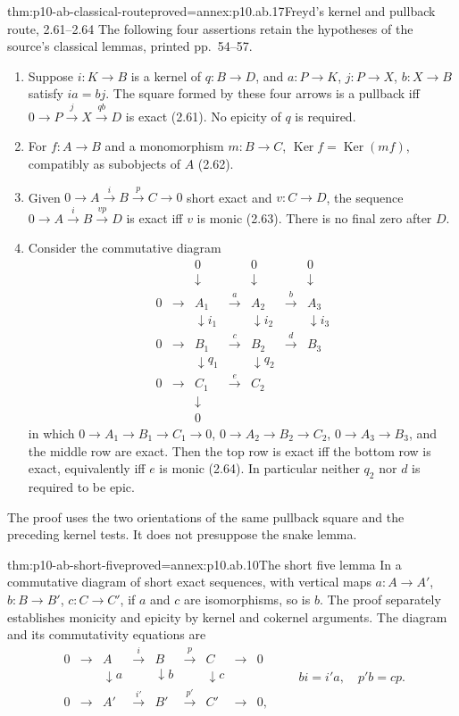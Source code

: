 \begin{hbtheorem}{thm:p10-ab-classical-route}{proved=annex:p10.ab.17}{Freyd's kernel and pullback route, 2.61--2.64}
The following four assertions retain the hypotheses of the source's
classical lemmas, printed pp.~54--57.
\begin{enumerate}
\item Suppose \(i:K\to B\) is a kernel of \(q:B\to D\), and
\(a:P\to K\), \(j:P\to X\), \(b:X\to B\) satisfy \(ia=bj\).
The square formed by these four arrows is a pullback iff
\(0\to P\xrightarrow j X\xrightarrow{qb}D\) is exact (2.61).
No epicity of \(q\) is required.
\item For \(f:A\to B\) and a monomorphism \(m:B\to C\),
\(\operatorname{Ker}f=\operatorname{Ker}(mf)\), compatibly as
subobjects of \(A\) (2.62).
\item Given \(0\to A\xrightarrow i B\xrightarrow p C\to0\)
short exact and \(v:C\to D\), the sequence
\(0\to A\xrightarrow i B\xrightarrow{vp}D\) is exact iff
\(v\) is monic (2.63). There is no final zero after \(D\).
\item Consider the commutative diagram
\[
\begin{array}{ccccccc}
 &&0&&0&&0\\
 &&\downarrow&&\downarrow&&\downarrow\\
 0&\to&A_1&\xrightarrow{a}&A_2&\xrightarrow{b}&A_3\\
 &&\downarrow i_1&&\downarrow i_2&&\downarrow i_3\\
 0&\to&B_1&\xrightarrow{c}&B_2&\xrightarrow{d}&B_3\\
 &&\downarrow q_1&&\downarrow q_2&&\\
 0&\to&C_1&\xrightarrow{e}&C_2&&\\
 &&\downarrow&&&&\\
 &&0&&&&
\end{array}
\]
in which \(0\to A_1\to B_1\to C_1\to0\),
\(0\to A_2\to B_2\to C_2\), \(0\to A_3\to B_3\),
and the middle row are exact. Then the top row is exact iff the
bottom row is exact, equivalently iff \(e\) is monic (2.64).
In particular neither \(q_2\) nor \(d\) is required to be epic.
\end{enumerate}
The proof uses the two orientations of the same pullback square and
the preceding kernel tests. It does not presuppose the snake lemma.
\end{hbtheorem}


\begin{hbtheorem}{thm:p10-ab-short-five}{proved=annex:p10.ab.10}{The short five lemma}
In a commutative diagram of short exact sequences, with vertical maps
\(a:A\to A'\), \(b:B\to B'\), \(c:C\to C'\), if \(a\) and
\(c\) are isomorphisms, so is \(b\). The proof separately establishes
monicity and epicity by kernel and cokernel arguments.
The diagram and its commutativity equations are
\[
 \begin{array}{ccccccccc}
 0&\to&A&\xrightarrow{i}&B&\xrightarrow{p}&C&\to&0\\
 &&\downarrow a&&\downarrow b&&\downarrow c&&\\
 0&\to&A'&\xrightarrow{i'}&B'&\xrightarrow{p'}&C'&\to&0,
 \end{array}
 \qquad bi=i'a,\quad p'b=cp.
\]
\end{hbtheorem}

